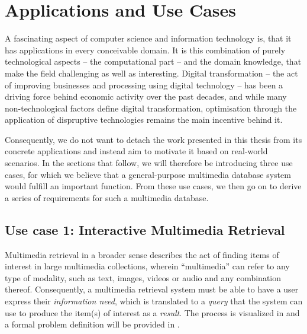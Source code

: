 \chapter{Applications and Use Cases}
\label{chapter:applications}

A fascinating aspect of computer science and information technology is, that it has applications in every conceivable domain. It is this combination of purely technological aspects -- the computational part -- and the domain knowledge, that make the field challenging as well as interesting. Digital transformation -- the act of improving businesses and processing using digital technology \cite{Vial:2019Understanding} -- has been a driving force behind economic activity over the past decades, and while many non-technological factors define digital transformation, optimisation through the application of dispruptive technologies remains the main incentive behind it.

Consequently, we do not want to detach the work presented in this thesis from its concrete applications and instead aim to motivate it based on real-world scenarios. In the sections that follow, we will therefore be introducing three use cases, for which we believe that a general-purpose multimedia database system would fulfill an important function. From these use cases, we then go on to derive a series of requirements for such a multimedia database.

\section{Use case 1: Interactive Multimedia Retrieval}
\label{section:application_retrieval}

Multimedia retrieval in a broader sense describes the act of finding items of interest in large multimedia collections, wherein ``multimedia'' can refer to any type of modality, such as text, images, videos or audio and any combination thereof. Consequently, a multimedia retrieval system must be able to have a user express their \emph{information need}, which is translated to a \emph{query} that the system can use to produce the item(s) of interest as a \emph{result}. The process is visualized in  and a formal problem definition will be provided in .

